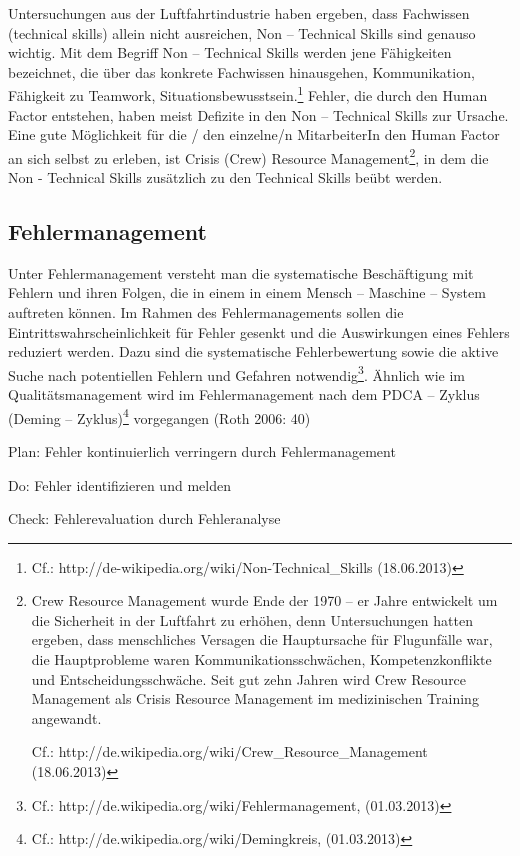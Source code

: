 Untersuchungen aus der Luftfahrtindustrie haben ergeben,
dass Fachwissen (technical skills) allein nicht ausreichen,
Non – Technical Skills sind genauso wichtig. Mit dem
Begriff Non – Technical Skills werden jene Fähigkeiten
bezeichnet, die über das konkrete Fachwissen hinausgehen,
Kommunikation, Fähigkeit zu Teamwork,
Situationsbewusstsein.\footnote{ Cf.:
http://de-wikipedia.org/wiki/Non-Technical\_Skills
(18.06.2013)} Fehler, die durch den Human Factor entstehen,
haben meist Defizite in den Non – Technical Skills zur
Ursache. Eine gute Möglichkeit für die / den einzelne/n
MitarbeiterIn den Human Factor an sich selbst zu erleben,
ist Crisis (Crew) Resource Management\footnote{ Crew
Resource Management wurde Ende der 1970 – er Jahre
entwickelt um die Sicherheit in der Luftfahrt zu erhöhen,
denn Untersuchungen hatten ergeben, dass menschliches
Versagen die Hauptursache für Flugunfälle war, die
Hauptprobleme waren Kommunikationsschwächen,
Kompetenzkonflikte und Entscheidungsschwäche. Seit gut zehn
Jahren wird Crew Resource Management als Crisis Resource
Management im medizinischen Training angewandt.\par Cf.:
http://de.wikipedia.org/wiki/Crew\_Resource\_Management
(18.06.2013)}, in dem die Non - Technical Skills zusätzlich
zu den Technical Skills beübt werden.




\subsection{Fehlermanagement}

Unter Fehlermanagement versteht man die systematische
Beschäftigung mit Fehlern und ihren Folgen, die in einem in
einem Mensch – Maschine – System auftreten können. Im
Rahmen des Fehlermanagements sollen die
Eintrittswahrscheinlichkeit für Fehler gesenkt und die
Auswirkungen eines Fehlers reduziert werden. Dazu sind die
systematische Fehlerbewertung sowie die aktive Suche nach
potentiellen Fehlern und Gefahren notwendig\footnote{ Cf.:
http://de.wikipedia.org/wiki/Fehlermanagement,
(01.03.2013)}. Ähnlich wie im Qualitätsmanagement wird im
Fehlermanagement nach dem PDCA – Zyklus (Deming –
Zyklus)\footnote{ Cf.:
http://de.wikipedia.org/wiki/Demingkreis, (01.03.2013)}
vorgegangen (Roth 2006: 40)

Plan: Fehler kontinuierlich verringern durch
Fehlermanagement

Do: Fehler identifizieren und melden

Check: Fehlerevaluation durch Fehleranalyse

